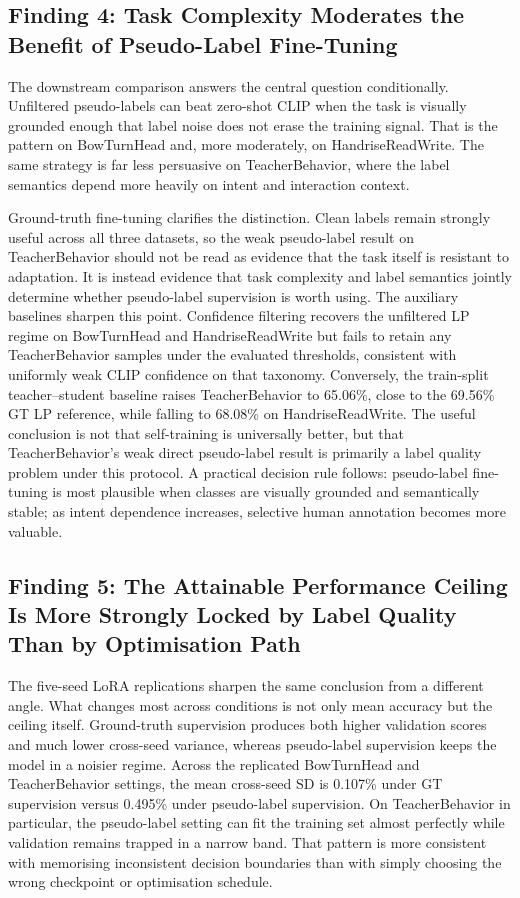 \documentclass{ieeeaccess}
\begin{document}
\subsection{Finding 4: Task Complexity Moderates the Benefit of
Pseudo-Label Fine-Tuning}

The downstream comparison answers the central question
conditionally.
Unfiltered pseudo-labels can beat zero-shot CLIP when the task is
visually grounded enough that label noise does not erase the training
signal.
That is the pattern on BowTurnHead and, more moderately, on
HandriseReadWrite.
The same strategy is far less persuasive on TeacherBehavior, where the
label semantics depend more heavily on intent and interaction context.

Ground-truth fine-tuning clarifies the distinction.
Clean labels remain strongly useful across all three datasets, so the
weak pseudo-label result on TeacherBehavior should not be read as
evidence that the task itself is resistant to adaptation.
It is instead evidence that task complexity and label semantics jointly
determine whether pseudo-label supervision is worth using.
The auxiliary baselines sharpen this point. Confidence filtering
recovers the unfiltered LP regime on BowTurnHead and HandriseReadWrite
but fails to retain any TeacherBehavior samples under the evaluated
thresholds, consistent with uniformly weak CLIP confidence on that
taxonomy. Conversely, the train-split teacher--student baseline raises
TeacherBehavior to 65.06\%, close to the 69.56\% GT LP reference, while
falling to 68.08\% on HandriseReadWrite. The useful conclusion is
not that self-training is universally better, but that
TeacherBehavior's weak direct pseudo-label result is primarily a label
quality problem under this protocol.
A practical decision rule follows: pseudo-label fine-tuning is most
plausible when classes are visually grounded and semantically stable;
as intent dependence increases, selective human annotation becomes more
valuable.

\subsection{Finding 5: The Attainable Performance Ceiling Is More
Strongly Locked by Label Quality Than by Optimisation Path}

The five-seed LoRA replications sharpen the same conclusion from a
different angle.
What changes most across conditions is not only mean accuracy but the
ceiling itself.
Ground-truth supervision produces both higher validation scores and
much lower cross-seed variance, whereas pseudo-label supervision keeps
the model in a noisier regime.
Across the replicated BowTurnHead and TeacherBehavior settings, the
mean cross-seed SD is 0.107\% under GT supervision versus 0.495\%
under pseudo-label supervision.
On TeacherBehavior in particular, the pseudo-label setting can fit the
training set almost perfectly while validation remains trapped in a
narrow band.
That pattern is more consistent with memorising inconsistent decision
boundaries than with simply choosing the wrong checkpoint or
optimisation schedule.
\end{document}
